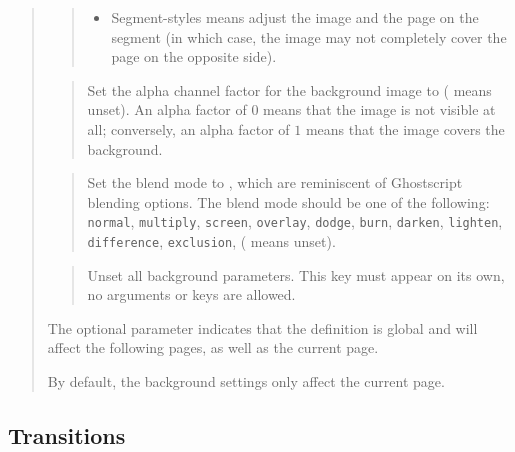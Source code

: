 \documentclass[12pt]{article}
\begin{document}
\begin{quote}
\begin{quote}
\begin {itemize}
\item Segment-styles means adjust the image and the page on the
segment (in which case, the image may not completely cover the page on
the opposite side).

\end {itemize}
\end{quote}

\begin{quote}
Set the alpha channel factor for the background image to 
( means unset). An alpha factor of $0$ means that the
image is not visible at all; conversely, an alpha factor of $1$ means that the
image covers the background.
\end{quote}

\begin{quote}
Set the blend mode to , which are reminiscent of
Ghostscript blending options. The blend mode should be one of the
following: {\tt normal}, {\tt multiply}, {\tt screen}, {\tt overlay},
{\tt dodge}, {\tt burn}, {\tt darken}, {\tt lighten}, {\tt
difference}, {\tt exclusion},
( means unset).
\end{quote}

\goodbreak
{}
\begin{quote}
Unset all background parameters.
This key must appear on its own, no arguments or keys are allowed. 
\end{quote}
The optional parameter  indicates that
the definition is global and will affect the following pages, 
as well as the current page.

By default, the background settings only affect the current page.
\end{quote}

\subsection{Transitions}
\end{document}

